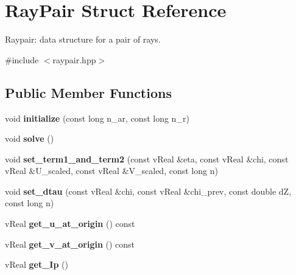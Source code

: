 \hypertarget{structRayPair}{}\section{Ray\+Pair Struct Reference}
\label{structRayPair}


Raypair\+: data structure for a pair of rays.  




{\ttfamily \#include $<$raypair.\+hpp$>$}

\subsection*{Public Member Functions}
\begin{DoxyCompactItemize}
\item 
\mbox{\label{structRayPair_aadb079089f5d5d230e26ecb00d3802cc}} 
void {\bfseries initialize} (const long n\+\_\+ar, const long n\+\_\+r)
\item 
\mbox{\label{structRayPair_a65f67e4d6a83dbfc2d8fe5a2520cd678}} 
void {\bfseries solve} ()
\item 
\mbox{\label{structRayPair_ac79352ff8e893cff0a5d752da4337a70}} 
void {\bfseries set\+\_\+term1\+\_\+and\+\_\+term2} (const v\+Real \&eta, const v\+Real \&chi, const v\+Real \&U\+\_\+scaled, const v\+Real \&V\+\_\+scaled, const long n)
\item 
\mbox{\label{structRayPair_a509c43c4a1682d360e16ae1818520ed0}} 
void {\bfseries set\+\_\+dtau} (const v\+Real \&chi, const v\+Real \&chi\+\_\+prev, const double dZ, const long n)
\item 
\mbox{\label{structRayPair_a25a21ab5df7a0112284f36e21fa8f9ef}} 
v\+Real {\bfseries get\+\_\+u\+\_\+at\+\_\+origin} () const
\item 
\mbox{\label{structRayPair_a5f3f4f7d73e6ff70f2ef4af897f80000}} 
v\+Real {\bfseries get\+\_\+v\+\_\+at\+\_\+origin} () const
\item 
\mbox{\label{structRayPair_aa40a22e8fa15929d68201c6f1c01b11a}} 
v\+Real {\bfseries get\+\_\+\+Ip} ()
\item 
\mbox{\label{structRayPair_a10e89a2201ee87e2ea5980108056cc09}} 

\end{DoxyCompactItemize}
